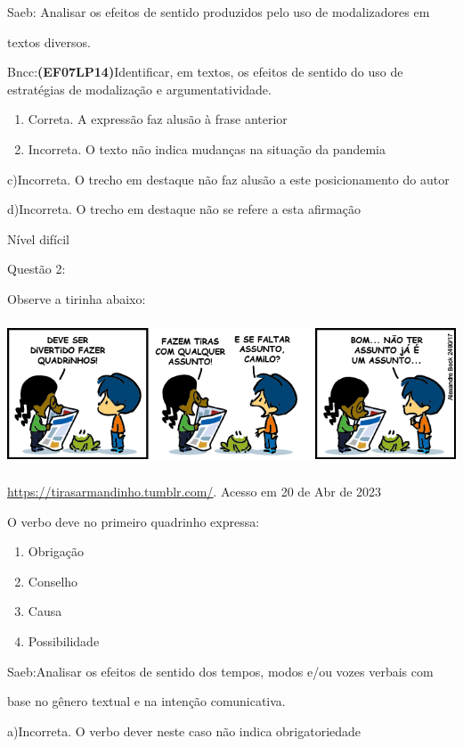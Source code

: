 {Saeb: Analisar os efeitos de sentido produzidos pelo uso de
modalizadores em

textos diversos.

Bncc:\textbf{(EF07LP14)}Identificar, em textos, os efeitos de sentido do
uso de estratégias de modalização e argumentatividade.

\begin{enumerate}
\def\labelenumi{\arabic{enumi}.}
\item
  Correta. A expressão faz alusão à frase anterior
\item
  Incorreta. O texto não indica mudanças na situação da pandemia
\end{enumerate}

c)Incorreta. O trecho em destaque não faz alusão a este posicionamento
do autor

d)Incorreta. O trecho em destaque não se refere a esta afirmação

Nível difícil

Questão 2:

Observe a tirinha abaixo:

\includegraphics[width=5.90551in,height=1.70833in]{./imgSAEB_7_POR/media/image12.png}

\href{https://tirasarmandinho.tumblr.com/}{\uline{https://tirasarmandinho.tumblr.com/}}.
Acesso em 20 de Abr de 2023

O verbo deve no primeiro quadrinho expressa:

\begin{enumerate}
\def\labelenumi{\alph{enumi})}
\item
  Obrigação
\item
  Conselho
\item
  Causa
\item
  Possibilidade
\end{enumerate}

Saeb:Analisar os efeitos de sentido dos tempos, modos e/ou vozes verbais
com

base no gênero textual e na intenção comunicativa.

a)Incorreta. O verbo dever neste caso não indica obrigatoriedade

}
